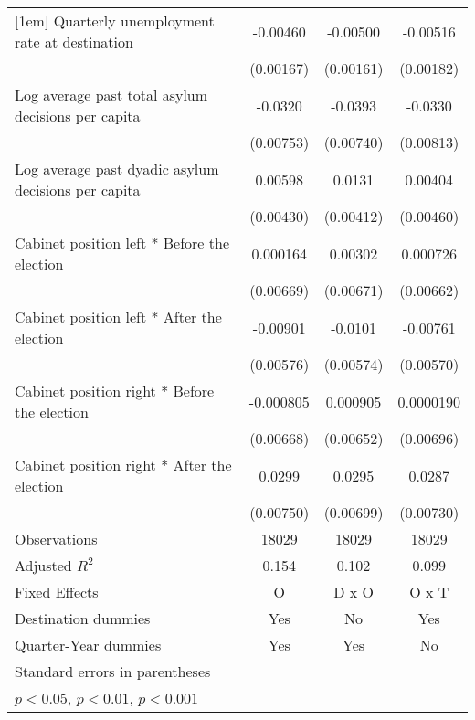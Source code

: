 \begin{table}[htbp]
\begin{tabular}{l*{3}{c}}
[1em]
Quarterly unemployment rate at destination&    -0.00460\sym{**} &    -0.00500\sym{**} &    -0.00516\sym{**} \\
                    &   (0.00167)         &   (0.00161)         &   (0.00182)         \\
[1em]
Log average past total asylum decisions per capita&     -0.0320\sym{***}&     -0.0393\sym{***}&     -0.0330\sym{***}\\
                    &   (0.00753)         &   (0.00740)         &   (0.00813)         \\
[1em]
Log average past dyadic asylum decisions per capita&     0.00598         &      0.0131\sym{**} &     0.00404         \\
                    &   (0.00430)         &   (0.00412)         &   (0.00460)         \\
[1em]
Cabinet position left * Before the election&    0.000164         &     0.00302         &    0.000726         \\
                    &   (0.00669)         &   (0.00671)         &   (0.00662)         \\
[1em]
Cabinet position left * After the election&    -0.00901         &     -0.0101         &    -0.00761         \\
                    &   (0.00576)         &   (0.00574)         &   (0.00570)         \\
[1em]
Cabinet position right * Before the election&   -0.000805         &    0.000905         &   0.0000190         \\
                    &   (0.00668)         &   (0.00652)         &   (0.00696)         \\
[1em]
Cabinet position right * After the election&      0.0299\sym{***}&      0.0295\sym{***}&      0.0287\sym{***}\\
                    &   (0.00750)         &   (0.00699)         &   (0.00730)         \\
\hline
Observations        &       18029         &       18029         &       18029         \\
Adjusted \(R^{2}\)  &       0.154         &       0.102         &       0.099         \\
Fixed Effects       &           O         &       D x O         &       O x T         \\
Destination dummies &         Yes         &          No         &         Yes         \\
Quarter-Year dummies&         Yes         &         Yes         &          No         \\
\hline\hline
\multicolumn{4}{l}{\footnotesize Standard errors in parentheses}\\
\multicolumn{4}{l}{\footnotesize \sym{*} \(p<0.05\), \sym{**} \(p<0.01\), \sym{***} \(p<0.001\)}\\
\end{tabular}
\end{table}
